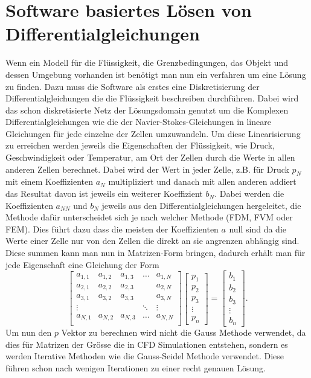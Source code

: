 \section{Software basiertes Lösen von Differentialgleichungen}
Wenn ein Modell für die Flüssigkeit, die Grenzbedingungen, das Objekt und dessen Umgebung vorhanden ist benötigt man nun ein verfahren um eine Lösung zu finden. 
Dazu muss die Software als erstes eine Diskretisierung der Differentialgleichungen die die Flüssigkeit beschreiben durchführen.
Dabei wird das schon diskretisierte Netz der Lösungsdomain genutzt um die Komplexen Differentialgleichungen wie die der Navier-Stokes-Gleichungen in lineare Gleichungen für jede einzelne der Zellen umzuwandeln.
Um diese Linearisierung zu erreichen werden jeweils die Eigenschaften der Flüssigkeit, wie Druck, Geschwindigkeit oder Temperatur, am Ort der Zellen durch die Werte in allen anderen Zellen berechnet.
Dabei wird der Wert in jeder Zelle, z.B. für Druck $p_N$ mit einem Koeffizienten $ a_{N} $ multipliziert und danach mit allen anderen addiert das Resultat davon ist jeweils ein weiterer Koeffizient $b_N$.
Dabei werden die Koeffizienten $a_{NN}$ und $b_{N }$ jeweils aus den Differentialgleichungen hergeleitet, die Methode dafür unterscheidet sich je nach welcher Methode (FDM, FVM oder FEM).
Dies führt dazu dass die meisten der Koeffizienten $a_{}$ null sind da die Werte einer Zelle nur von den Zellen die direkt an sie angrenzen abhängig sind.
Diese summen kann man nun in Matrizen-Form bringen, dadurch erhält man für jede Eigenschaft eine Gleichung der Form
\begin{equation}
\begin{bmatrix}
	a_{1,1} &  a_{1,2} & a_{1,3} & \dots & a_{1,N} \\
	a_{2,1} &  a_{2,2} & a_{2,3} &  & a_{2,N} \\
	a_{3,1} &  a_{3,2} & a_{3,3} &  & a_{3,N} \\
	\vdots & &  & \ddots & \vdots \\
	a_{N,1} &  a_{N,2} & a_{N,3} & \dots & a_{N,N} \\
\end{bmatrix}
\begin{bmatrix}
	p_{1} \\
	p_{2} \\
	p_{3} \\
	\vdots \\
	p_{n}
\end{bmatrix}
= 
\begin{bmatrix}
b_{1} \\
b_{2} \\
b_{3} \\
\vdots \\
b_{n}
\end{bmatrix}
.
\end{equation}
Um nun den $p$ Vektor zu berechnen wird nicht die Gauss Methode verwendet, da dies für Matrizen der Grösse die in CFD Simulationen entstehen, sondern es werden Iterative Methoden wie die Gauss-Seidel Methode verwendet.
Diese führen schon nach wenigen Iterationen zu einer recht genauen Lösung.